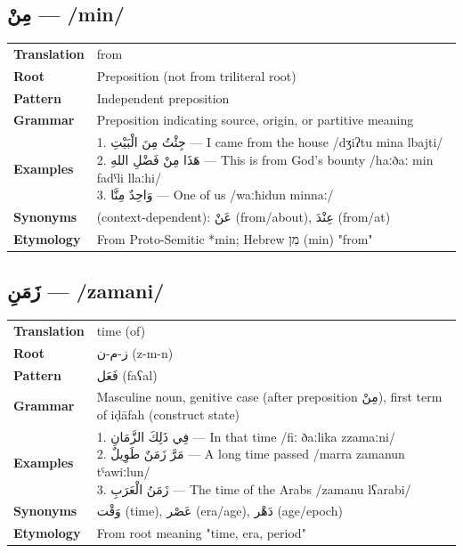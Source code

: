\documentclass[letterpaper,12pt]{article}
\begin{document}
\subsection{\textarabic{مِنْ} — /min/}
\begin{tabular}{p{3cm}p{10cm}}
\toprule
\textbf{Translation} & from \\
\textbf{Root} & Preposition (not from triliteral root) \\
\textbf{Pattern} & Independent preposition \\
\textbf{Grammar} & Preposition indicating source, origin, or partitive meaning \\
\midrule
\textbf{Examples} & \makecell[l]{\parbox{9.5cm}{
1. \textarabic{جِئْتُ مِنَ الْبَيْتِ} — I came from the house /dʒiʔtu mina lbajti/\\
2. \textarabic{هَذَا مِنْ فَضْلِ اللهِ} — This is from God's bounty /haːðaː min fadˤli llaːhi/\\
3. \textarabic{وَاحِدٌ مِنَّا} — One of us /waːħidun minnaː/
}} \\
\midrule
\textbf{Synonyms} & (context-dependent): \textarabic{عَنْ} (from/about), \textarabic{عِنْدَ} (from/at) \\
\textbf{Etymology} & From Proto-Semitic *min; Hebrew \texthebrew{מִן} (min) "from" \\
\bottomrule
\end{tabular}

\subsection{\textarabic{زَمَنِ} — /zamani/}
\begin{tabular}{p{3cm}p{10cm}}
\toprule
\textbf{Translation} & time (of) \\
\textbf{Root} & \textarabic{ز-م-ن} (z-m-n) \\
\textbf{Pattern} & \textarabic{فَعَل} (faʕal) \\
\textbf{Grammar} & Masculine noun, genitive case (after preposition \textarabic{مِنْ}), first term of iḍāfah (construct state) \\
\midrule
\textbf{Examples} & \makecell[l]{\parbox{9.5cm}{
1. \textarabic{فِي ذَلِكَ الزَّمَانِ} — In that time /fiː ðaːlika zzamaːni/\\
2. \textarabic{مَرَّ زَمَنٌ طَوِيلٌ} — A long time passed /marra zamanun tˤawiːlun/\\
3. \textarabic{زَمَنُ الْعَرَبِ} — The time of the Arabs /zamanu lʕarabi/
}} \\
\midrule
\textbf{Synonyms} & \textarabic{وَقْت} (time), \textarabic{عَصْر} (era/age), \textarabic{دَهْر} (age/epoch) \\
\textbf{Etymology} & From root meaning "time, era, period" \\
\bottomrule
\end{tabular}
\end{document}
